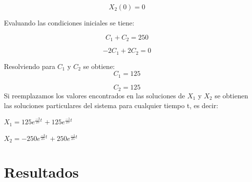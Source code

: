 \documentclass[titlepage]{article}
\begin{document}
                    \begin{equation*}
                        X_2(0) = 0
                    \end{equation*}
                
                Evaluando las condiciones iniciales se tiene:
                
                    \begin{equation*}
                        C_1 + C_2 = 250
                    \end{equation*}    
                    
                    \begin{equation*}
                        -2C_1 + 2C_2 = 0
                    \end{equation*}\vspace{0.3cm}
                    
                Resolviendo para $C_1$ y $C_2$ se obtiene:
                    \begin{equation*}
                        C_1 = 125
                    \end{equation*}    
                    
                    \begin{equation*}
                        C_2 = 125
                    \end{equation*}
                Si reemplazamos los valores encontrados en las soluciones de $X_1$ y $X_2$ se obtienen las soluciones particulares del sistema para cualquier tiempo t, es decir:
                
                    \begin{center}
                    
                        $X_1 = 125e^{\frac{-3}{25}t}$ $+~125e^{\frac{-1}{25}t}$
    
                    \end{center}
                
                    \begin{center}
                    
                        $X_2 = -250e^{\frac{-3}{25}t}$ $+~250e^{\frac{-1}{25}t}$
    
                    \end{center}  
                    
    \section{Resultados}
    
\end{document}
